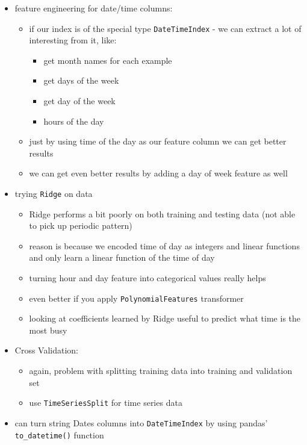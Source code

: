 \documentclass[10.5pt,a4paper, fleqn, dvipsnames]{article}
\begin{document}
\begin{itemize}
\begin{itemize}
    \end{itemize}
    \item feature engineering for date/time columns: 
    \begin{itemize}
        \item if our index is of the special type \lstinline{DateTimeIndex} - we can extract a lot of interesting from it, like: 
        \begin{itemize}[leftmargin = 2em]
            \item get month names for each example
            \item get days of the week
            \item get day of the week
            \item hours of the day
        \end{itemize}
        \item just by using time of the day as our feature column we can get better results
        \item we can get even better results by adding a day of week feature as well 
    \end{itemize}
    \item trying \lstinline{Ridge} on data 
    \begin{itemize}
        \item Ridge performs a bit poorly on both training and testing data (not able to pick up periodic pattern)
        \item reason is because we encoded time of day as integers and linear functions and only learn a linear function of the time of day
        \item turning hour and day feature into categorical values really helps
        \item even better if you apply \lstinline{PolynomialFeatures} transformer 
        \item looking at coefficients learned by Ridge useful to predict what time is the most busy 
    \end{itemize}
    \item Cross Validation:
    \begin{itemize}
        \item again, problem with splitting training data into training and validation set
        \item use \lstinline{TimeSeriesSplit} for time series data
    \end{itemize}
    \item can turn string Dates columns into \lstinline{DateTimeIndex} by using pandas' \lstinline{to_datetime()} function

\end{itemize}
\end{document}
